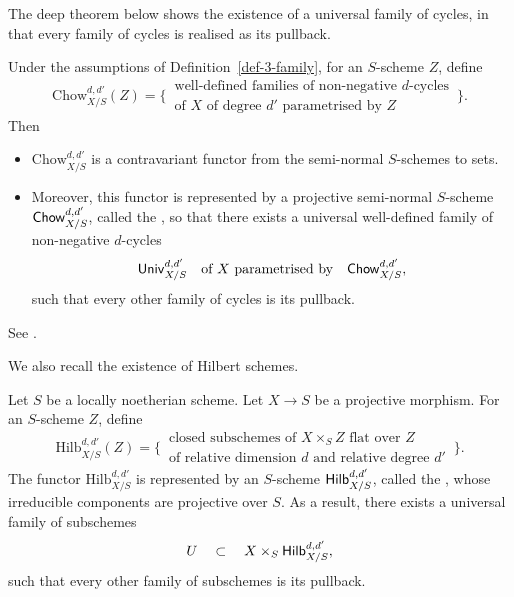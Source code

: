 The deep theorem below shows the existence of
a universal family of cycles,
in that every family of cycles is realised as its pullback.

\begin{theorem}
    Under the assumptions of Definition~\textup{\ref{def-3-family}},
    for an $S$-scheme $Z$, define
    \[ \mathrm{Chow}_{X/S}^{d,d'} (Z) = \biggl\{ \,
        \begin{matrix}
            \text{well-defined families of non-negative $d$-cycles} \\
            \text{of $X$ of degree $d'$ parametrised by $Z$}
        \end{matrix} \,
    \biggr\}. \]
    Then 
    \begin{itemize}
        \item
            $\mathrm{Chow}_{X/S}^{d,d'}$
            is a contravariant functor
            from the semi-normal $S$-schemes to sets.
        \item
            Moreover, this functor is represented by a
            projective semi-normal $S$-scheme $\textsf{\textup{Chow}}_{X/S}^{d,d'}$,
            called the ,
            so that there exists a universal
            well-defined family of non-negative $d$-cycles
            \[ \textsf{\textup{Univ}}_{X/S}^{d,d'} \quad \text{of $X$ parametrised by} \quad \textsf{\textup{Chow}}_{X/S}^{d,d'}, \]
            such that every other family of cycles is its pullback.
    \end{itemize}
\end{theorem}

See \cite[Theorem~I.3.21]{kollar}. 

We also recall the existence of Hilbert schemes.

\begin{theorem}
    Let $S$ be a locally noetherian scheme.
    Let $X \to S$ be a projective morphism.
    For an $S$-scheme $Z$, define 
    \[ \mathrm{Hilb}_{X/S}^{d,d'} (Z) = \biggl\{ \,
        \begin{matrix}
            \text{closed subschemes of $X \times_S Z$ flat over $Z$} \\
            \text{of relative dimension $d$ and relative degree $d'$}
        \end{matrix} \,
    \biggr\}. \]
    The functor $\mathrm{Hilb}_{X/S}^{d,d'}$ is represented
    by an $S$-scheme $\textsf{\textup{Hilb}}_{X/S}^{d,d'}$, called the ,
    whose irreducible components are projective over $S$.
    As a result, there exists a universal family of subschemes
    \[ U \quad \subset \quad X \times_S \textsf{\textup{Hilb}}_{X/S}^{d,d'}, \]
    such that every other family of subschemes is its pullback.
\end{theorem}

